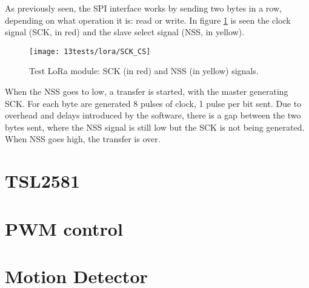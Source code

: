 As previously seen, the SPI interface works by sending two bytes in a row, depending on what operation it is: read or write. In figure \ref{fig:loratest_sck_nss} is seen the clock signal (SCK, in red) and the slave select signal (NSS, in yellow).

\begin{figure}[H]
	\centering	
	\texttt{[image: 13tests/lora/SCK\_CS]}
	\caption{Test LoRa module: SCK (in red) and NSS (in yellow) signals.}
	\label{fig:loratest_sck_nss}
\end{figure}

When the NSS goes to low, a transfer is started, with the master generating SCK. For each byte are generated 8 pulses of clock, 1 pulse per bit sent. Due to overhead and delays introduced by the software, there is a gap between the two bytes sent, where the NSS signal is still low but the SCK is not being generated. When NSS goes high, the transfer is over.


\section{TSL2581}

\section{PWM control}

\section{Motion Detector}